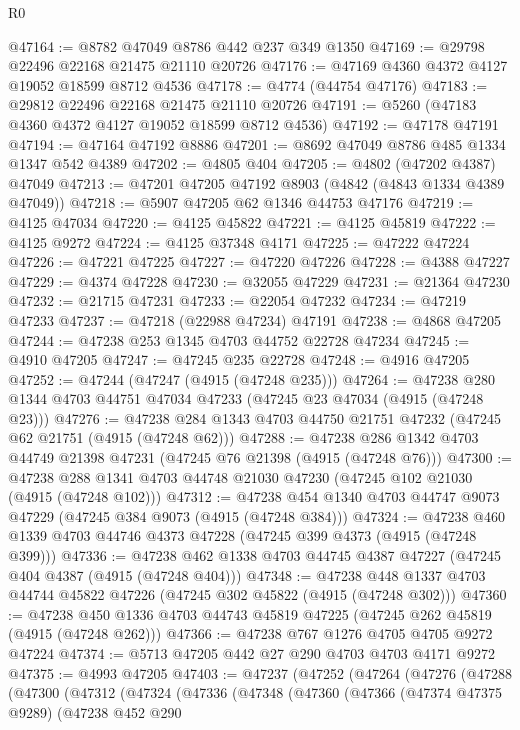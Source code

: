 \begin{lexlean}{R0}
\begin{coremodule}
@47164 := @8782 @47049 @8786 @442 @237 @349 @1350
@47169 := @29798 @22496 @22168 @21475 @21110 @20726
@47176 := @47169 @4360 @4372 @4127 @19052 @18599 @8712 @4536
@47178 := @4774 (@44754 @47176)
@47183 := @29812 @22496 @22168 @21475 @21110 @20726
@47191 := @5260 (@47183 @4360 @4372 @4127 @19052 @18599 @8712 @4536)
@47192 := @47178 @47191
@47194 := @47164 @47192 @8886
@47201 := @8692 @47049 @8786 @485 @1334 @1347 @542 @4389
@47202 := @4805 @404
@47205 := @4802 (@47202 @4387) @47049
@47213 := @47201 @47205 @47192 @8903 (@4842 (@4843 @1334 @4389 @47049))
@47218 := @5907 @47205 @62 @1346 @44753 @47176
@47219 := @4125 @47034
@47220 := @4125 @45822
@47221 := @4125 @45819
@47222 := @4125 @9272
@47224 := @4125 @37348 @4171
@47225 := @47222 @47224
@47226 := @47221 @47225
@47227 := @47220 @47226
@47228 := @4388 @47227
@47229 := @4374 @47228
@47230 := @32055 @47229
@47231 := @21364 @47230
@47232 := @21715 @47231
@47233 := @22054 @47232
@47234 := @47219 @47233
@47237 := @47218 (@22988 @47234) @47191
@47238 := @4868 @47205
@47244 := @47238 @253 @1345 @4703 @44752 @22728 @47234
@47245 := @4910 @47205
@47247 := @47245 @235 @22728
@47248 := @4916 @47205
@47252 := @47244 (@47247 (@4915 (@47248 @235)))
@47264 := @47238 @280 @1344 @4703 @44751 @47034 @47233 (@47245 @23 @47034 (@4915 (@47248 @23)))
@47276 := @47238 @284 @1343 @4703 @44750 @21751 @47232 (@47245 @62 @21751 (@4915 (@47248 @62)))
@47288 := @47238 @286 @1342 @4703 @44749 @21398 @47231 (@47245 @76 @21398 (@4915 (@47248 @76)))
@47300 := @47238 @288 @1341 @4703 @44748 @21030 @47230 (@47245 @102 @21030 (@4915 (@47248 @102)))
@47312 := @47238 @454 @1340 @4703 @44747 @9073 @47229 (@47245 @384 @9073 (@4915 (@47248 @384)))
@47324 := @47238 @460 @1339 @4703 @44746 @4373 @47228 (@47245 @399 @4373 (@4915 (@47248 @399)))
@47336 := @47238 @462 @1338 @4703 @44745 @4387 @47227 (@47245 @404 @4387 (@4915 (@47248 @404)))
@47348 := @47238 @448 @1337 @4703 @44744 @45822 @47226 (@47245 @302 @45822 (@4915 (@47248 @302)))
@47360 := @47238 @450 @1336 @4703 @44743 @45819 @47225 (@47245 @262 @45819 (@4915 (@47248 @262)))
@47366 := @47238 @767 @1276 @4705 @4705 @9272 @47224
@47374 := @5713 @47205 @442 @27 @290 @4703 @4703 @4171 @9272
@47375 := @4993 @47205
@47403 := @47237
    (@47252
      (@47264
        (@47276
          (@47288
            (@47300
              (@47312
                (@47324
                  (@47336
                    (@47348
                      (@47360
                        (@47366
                          (@47374 @47375 @9289)
                          (@47238
                            @452
                            @290

\end{coremodule}
\end{lexlean}
